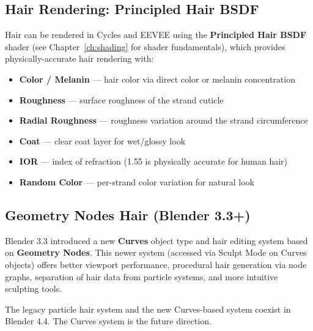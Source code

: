 \subsection{Hair Rendering: Principled Hair BSDF}

Hair can be rendered in Cycles and EEVEE using the \textbf{Principled Hair BSDF} shader (see Chapter~\ref{ch:shading} for shader fundamentals), which provides physically-accurate hair rendering with:

\begin{itemize}[leftmargin=2em]
  \item \textbf{Color / Melanin} --- hair color via direct color or melanin concentration
  \item \textbf{Roughness} --- surface roughness of the strand cuticle
  \item \textbf{Radial Roughness} --- roughness variation around the strand circumference
  \item \textbf{Coat} --- clear coat layer for wet/glossy look
  \item \textbf{IOR} --- index of refraction (1.55 is physically accurate for human hair)
  \item \textbf{Random Color} --- per-strand color variation for natural look
\end{itemize}

\subsection{Geometry Nodes Hair (Blender 3.3+)}

Blender 3.3 introduced a new \textbf{Curves} object type and hair editing system based on \textbf{Geometry Nodes}. This newer system (accessed via Sculpt Mode on Curves objects) offers better viewport performance, procedural hair generation via node graphs, separation of hair data from particle systems, and more intuitive sculpting tools.

The legacy particle hair system and the new Curves-based system coexist in Blender 4.4. The Curves system is the future direction.

